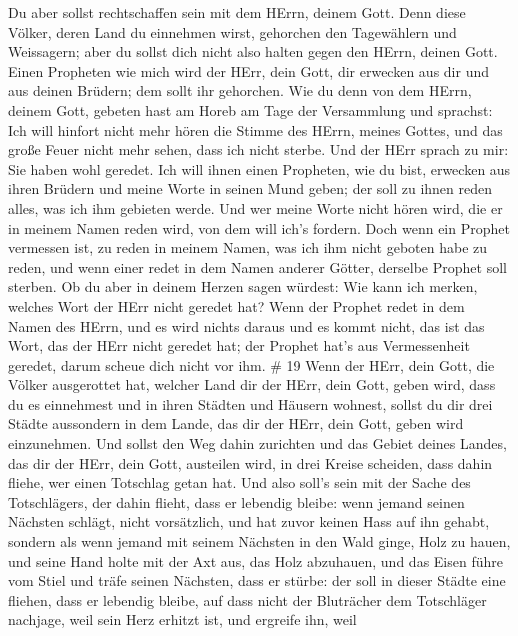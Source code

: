  Du aber sollst rechtschaffen sein mit dem HErrn, deinem
Gott.  Denn diese Völker, deren Land du einnehmen wirst,
gehorchen den Tagewählern und Weissagern; aber du sollst dich nicht also
halten gegen den HErrn, deinen Gott.  Einen Propheten wie
mich wird der HErr, dein Gott, dir erwecken aus dir und aus deinen
Brüdern; dem sollt ihr gehorchen.  Wie du denn von dem
HErrn, deinem Gott, gebeten hast am Horeb am Tage der Versammlung und
sprachst: Ich will hinfort nicht mehr hören die Stimme des HErrn, meines
Gottes, und das große Feuer nicht mehr sehen, dass ich nicht sterbe.
 Und der HErr sprach zu mir: Sie haben wohl geredet.
 Ich will ihnen einen Propheten, wie du bist, erwecken aus
ihren Brüdern und meine Worte in seinen Mund geben; der soll zu ihnen
reden alles, was ich ihm gebieten werde.  Und wer meine
Worte nicht hören wird, die er in meinem Namen reden wird, von dem will
ich's fordern.  Doch wenn ein Prophet vermessen ist, zu
reden in meinem Namen, was ich ihm nicht geboten habe zu reden, und wenn
einer redet in dem Namen anderer Götter, derselbe Prophet soll sterben.
 Ob du aber in deinem Herzen sagen würdest: Wie kann ich
merken, welches Wort der HErr nicht geredet hat?  Wenn der
Prophet redet in dem Namen des HErrn, und es wird nichts daraus und es
kommt nicht, das ist das Wort, das der HErr nicht geredet hat; der
Prophet hat's aus Vermessenheit geredet, darum scheue dich nicht vor
ihm. \# 19  Wenn der HErr, dein Gott, die Völker ausgerottet
hat, welcher Land dir der HErr, dein Gott, geben wird, dass du es
einnehmest und in ihren Städten und Häusern wohnest,  sollst
du dir drei Städte aussondern in dem Lande, das dir der HErr, dein Gott,
geben wird einzunehmen.  Und sollst den Weg dahin zurichten
und das Gebiet deines Landes, das dir der HErr, dein Gott, austeilen
wird, in drei Kreise scheiden, dass dahin fliehe, wer einen Totschlag
getan hat.  Und also soll's sein mit der Sache des
Totschlägers, der dahin flieht, dass er lebendig bleibe: wenn jemand
seinen Nächsten schlägt, nicht vorsätzlich, und hat zuvor keinen Hass
auf ihn gehabt,  sondern als wenn jemand mit seinem Nächsten
in den Wald ginge, Holz zu hauen, und seine Hand holte mit der Axt aus,
das Holz abzuhauen, und das Eisen führe vom Stiel und träfe seinen
Nächsten, dass er stürbe: der soll in dieser Städte eine fliehen, dass
er lebendig bleibe,  auf dass nicht der Bluträcher dem
Totschläger nachjage, weil sein Herz erhitzt ist, und ergreife ihn, weil
